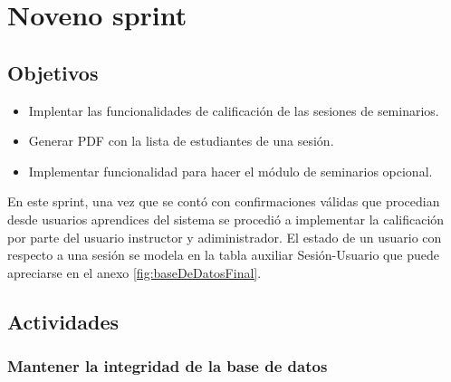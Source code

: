 \section{Noveno sprint} %
\label{sec:noveno_sprint}

\subsection{Objetivos}

\begin{itemize}
	\item Implentar las funcionalidades de calificación de las sesiones de seminarios.
	\item Generar PDF con la lista de estudiantes de una sesión.
	\item Implementar funcionalidad para hacer el módulo de seminarios opcional.
\end{itemize}

En este sprint, una vez que se contó con confirmaciones válidas que procedian desde usuarios aprendices del sistema se procedió a implementar la calificación por parte del usuario instructor y adiministrador. El estado de un usuario con respecto a una sesión se modela en la tabla auxiliar Sesión-Usuario que puede apreciarse en el anexo \ref{fig:baseDeDatosFinal}.

\subsection{Actividades} %
\label{sub:actividades6}

\subsubsection{Mantener la integridad de la base de datos}


